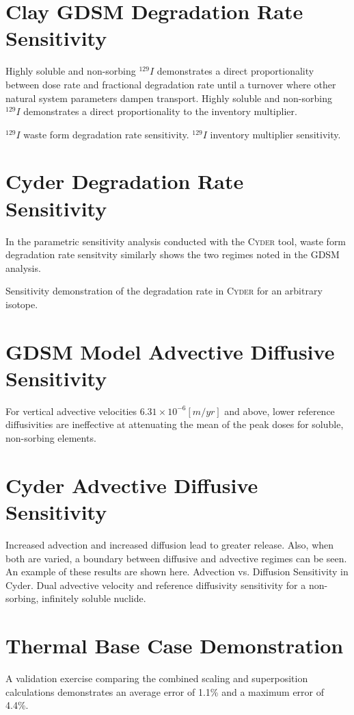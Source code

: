 \documentclass[letterpaper]{article}
\newcommand{\Cyder}{\textsc{Cyder}\xspace}
\begin{document}
\section*{Clay GDSM Degradation Rate Sensitivity}

Highly soluble and non-sorbing $^{129}I$ demonstrates a direct proportionality between dose rate and 
fractional degradation rate until a turnover where other natural system 
parameters dampen transport. Highly soluble and non-sorbing $^{129}I$ demonstrates a direct 
proportionality to the inventory multiplier.

$^{129}I$ waste form degradation rate sensitivity.
$^{129}I$ inventory multiplier sensitivity.


\section*{Cyder Degradation Rate Sensitivity}
In the parametric sensitivity analysis conducted with the \Cyder tool, waste 
form degradation rate sensitvity similarly shows the two regimes noted in the 
GDSM analysis.  

Sensitivity demonstration of the degradation rate in \Cyder for an 
arbitrary isotope.


\section*{GDSM Model Advective Diffusive Sensitivity}
For vertical advective velocities 
$6.31\times10^{-6}[m/yr]$ and above, lower reference diffusivities are 
ineffective at attenuating the mean of the peak doses for soluble, non-sorbing 
elements. 

\section*{Cyder Advective Diffusive Sensitivity}
Increased advection and increased diffusion lead to greater release. Also, when 
both are varied, a boundary between diffusive and advective
regimes can be seen. An example of these results are shown here.
Advection vs. Diffusion Sensitivity in Cyder. Dual advective velocity 
and reference diffusivity sensitivity for a non-sorbing, infinitely soluble 
nuclide.

  \section*{Thermal Base Case Demonstration}
A validation exercise comparing the combined scaling and  
superposition calculations demonstrates an average error of 1.1\% and a 
maximum error of 4.4\%.
\end{document}
